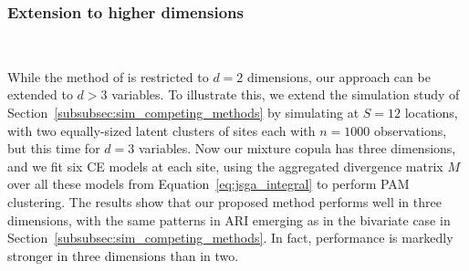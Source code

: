 \documentclass[12pt]{article}
\newcommand{\JSGa}{\mathop{\mathrm{JS}^{\mathrm{G}_{\lambda}}}\nolimits}
\begin{document}
\subsubsection{Extension to higher dimensions}~\label{subsubsec:sim_extension}

While the method of \citet{Vignotto2021} is restricted to $d = 2$ dimensions, our approach can be extended to $d > 3$ variables. 
To illustrate this, we extend the simulation study of Section~\ref{subsubsec:sim_competing_methods} by simulating at $S = 12$ locations, with two equally-sized latent clusters of sites each with $n = 1000$ observations, but this time for $d = 3$ variables.
Now our mixture copula has three dimensions, and we fit six CE models at each site, using the aggregated divergence matrix $M$ over all these models from Equation~\eqref{eq:jsga_integral} to perform PAM clustering. 
The results show that our proposed method performs well in three dimensions, with the same patterns in ARI emerging as in the bivariate case in Section~\ref{subsubsec:sim_competing_methods}.
In fact, performance is markedly stronger in three dimensions than in two. 
\end{document}
